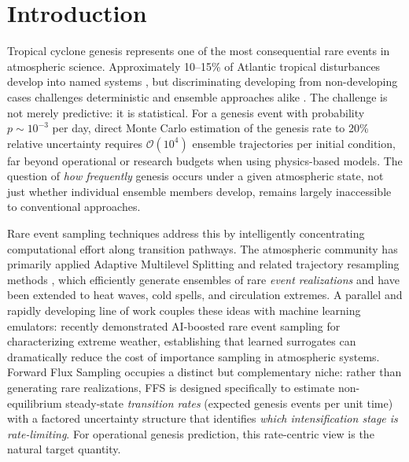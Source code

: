 \documentclass[11pt]{article}
\begin{document}
\section{Introduction}

Tropical cyclone genesis represents one of the most consequential rare events in
atmospheric science. Approximately 10--15\% of Atlantic tropical disturbances develop
into named systems \citep{Frank1970,Landsea1998}, but discriminating developing from
non-developing cases challenges deterministic and ensemble approaches alike
\citep{Titley2000,Halperin2013}. The challenge is not merely predictive: it is
statistical. For a genesis event with probability $p \sim 10^{-3}$ per day, direct
Monte Carlo estimation of the genesis rate to 20\% relative uncertainty requires
$\mathcal{O}(10^4)$ ensemble trajectories per initial condition, far beyond
operational or research budgets when using physics-based models. The question of
\textit{how frequently} genesis occurs under a given atmospheric state, not just
whether individual ensemble members develop, remains largely inaccessible to
conventional approaches.

Rare event sampling techniques address this by intelligently concentrating
computational effort along transition pathways. The atmospheric community has
primarily applied Adaptive Multilevel Splitting \citep[AMS;][]{ragone2018computation,
webber2019practical} and related trajectory resampling methods
\citep{finkel2023revealing,finkel2024bringing}, which efficiently generate ensembles of
rare \textit{event realizations} and have been extended to heat waves, cold spells, and
circulation extremes. A parallel and rapidly developing line of work couples these ideas
with machine learning emulators: \citet{lancelin2025ai} recently demonstrated
AI-boosted rare event sampling for characterizing extreme weather, establishing that
learned surrogates can dramatically reduce the cost of importance sampling in atmospheric
systems. Forward Flux Sampling \citep{allen2006forward,allen2009forward,hussain2020studying}
occupies a distinct but complementary niche: rather than generating rare realizations,
FFS is designed specifically to estimate non-equilibrium steady-state \textit{transition
rates} (expected genesis events per unit time) with a factored uncertainty
structure that identifies \textit{which intensification stage is rate-limiting}.
For operational genesis prediction, this rate-centric view is the natural target quantity.
\end{document}
